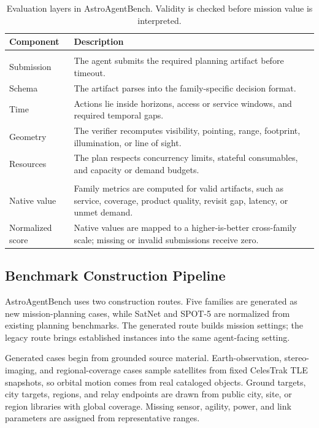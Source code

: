 \documentclass[11pt]{article}
\begin{document}
\begin{table}[t]
\centering
\small
\setlength{\tabcolsep}{5pt}
\begin{tabular}{>{\raggedright\arraybackslash}p{}>{\raggedright\arraybackslash}p{}}
\hline
\textbf{Component} & \textbf{Description} \\
\hline
\multicolumn{2}{c}{\cellcolor{gray!18}\textit{Validity}} \\
Submission & The agent submits the required planning artifact before timeout. \\
Schema & The artifact parses into the family-specific decision format. \\
Time & Actions lie inside horizons, access or service windows, and required temporal gaps. \\
Geometry & The verifier recomputes visibility, pointing, range, footprint, illumination, or line of sight. \\
Resources & The plan respects concurrency limits, stateful consumables, and capacity or demand budgets. \\
\hline
\multicolumn{2}{c}{\cellcolor{gray!18}\textit{Performance}} \\
Native value & Family metrics are computed for valid artifacts, such as service, coverage, product quality, revisit gap, latency, or unmet demand. \\
Normalized score & Native values are mapped to a higher-is-better cross-family scale; missing or invalid submissions receive zero. \\
\hline
\end{tabular}
\caption{Evaluation layers in AstroAgentBench. Validity is checked before mission value is interpreted.}
\label{tab:evaluation-layers}
\end{table}

\subsection{Benchmark Construction Pipeline}
\label{sec:construction-pipeline}

AstroAgentBench uses two construction routes. Five families are generated as new mission-planning cases, while SatNet and SPOT-5 are normalized from existing planning benchmarks. The generated route builds mission settings; the legacy route brings established instances into the same agent-facing setting.

Generated cases begin from grounded source material. Earth-observation, stereo-imaging, and regional-coverage cases sample satellites from fixed CelesTrak TLE snapshots, so orbital motion comes from real cataloged objects. Ground targets, city targets, regions, and relay endpoints are drawn from public city, site, or region libraries with global coverage. Missing sensor, agility, power, and link parameters are assigned from representative ranges.
\end{document}
